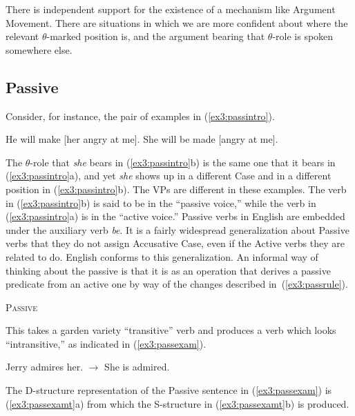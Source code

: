 There is independent support for the existence of a mechanism like Argument Movement. There are situations in which we are more confident about where the relevant \mbox{$\theta$-marked} position is, and the argument bearing that \mbox{$\theta$-role} is spoken somewhere else. 

\subsection{Passive}
\label{sub:passive}

Consider, for instance, the pair of examples in (\ref{ex3:passintro}).%
\begin{exe}
	\ex \label{ex3:passintro}
	\begin{xlist}
	\ex He will make [her angry at me].
	\ex She will be made [angry at me].
\end{xlist}
\end{exe}
The $\theta$-role that \emph{she} bears in (\ref{ex3:passintro}b) is the same one that it bears in (\ref{ex3:passintro}a), and yet \emph{she} shows up in a different Case and in a different position in (\ref{ex3:passintro}b). The VPs are different in these examples. The verb in (\ref{ex3:passintro}b) is said to be in the ``passive voice,'' while the verb in (\ref{ex3:passintro}a) is in the ``active voice.'' Passive verbs in English are embedded under the auxiliary verb \emph{be}. It is a fairly widespread generalization about Passive verbs that they do not assign Accusative Case, even if the Active verbs they are related to do. English conforms to this generalization. An informal way of thinking about the passive is that it is as an operation that derives a passive predicate from an active one by way of the changes described in~(\ref{ex3:passrule}).
\begin{exe}
	\ex \label{ex3:passrule} \textsc{Passive}
	\begin{xlist}
	\end{xlist}							
\end{exe}
This takes a garden variety ``transitive'' verb and produces a verb which looks ``intransitive,'' as indicated in (\ref{ex3:passexam}).
\begin{exe}
	\ex \label{ex3:passexam} Jerry admires her. $\rightarrow$ She is admired.
\end{exe}
The D-structure representation of the Passive sentence in (\ref{ex3:passexam}) is (\ref{ex3:passexamt}a) from which the S-structure in (\ref{ex3:passexamt}b) is produced.%
